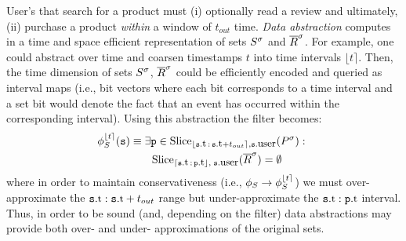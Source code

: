 \newcommand{\NotExistsP}{\ident{NotExistsP}}
\newcommand{\PrecedesP}{\precs{S}}
\newcommand{\PrecedesPP}{\omega_S}
\newcommand{\PrecedesPPP}{\psi_S}
\newcommand{\PrecedesPPPP}{\upsilon_S}


\newcommand{\interval}[1]{\lfloor #1 \rceil}
\newcommand{\uinterval}[1]{\lceil #1 \rfloor}
\newcommand{\hashid}[1]{\# #1}

User's that search for a product must (i) optionally read a review and
ultimately, (ii) purchase a product \emph{within} a window of $t_{out}$
time. \emph{Data abstraction} computes in a time and space efficient
representation of sets ${S}^{\sigma}$ and ${\overline{R}}^{\sigma}$.  For example, one could
abstract over time and coarsen timestamps $t$ into time intervals
$\interval{t}$.  Then, the time dimension of sets ${S}^{\sigma}$, ${\overline{R}}^{\sigma}$ could
be efficiently encoded and queried as interval maps (i.e., bit vectors where
each bit corresponds to a time interval and a set bit would denote the fact that
an event has occurred within the corresponding interval).  Using this
abstraction the filter becomes:
\begin{align*}
\PrecedesP^{\interval{t}}(\symv{s}) 
&\equiv  
\exists \symv{p} \in 
\slice{\syms{P}}
{\interval{\facc{\symv{s}}{t}\,:\,\facc{\symv{s}}{t} + t_{out}},
	\facc{\symv{s}}{user}} :\ 
\\
&\qquad
\slice{\syms{\oR}}
{\uinterval{\facc{\symv{s}}{t}\,:\,\facc{\symv{p}}{t}},\; 
 \facc{\symv{s}}{user}}
= \emptyset 
\end{align*}
where in order to maintain conservativeness (i.e.,
$\PrecedesP \rightarrow \PrecedesP^{\interval{t}} $) we must over-approximate
the $\facc{\symv{s}}{t}:\facc{\symv{s}}{t} + t_{out}$ range but
under-approximate the $\facc{\symv{s}}{t}:\facc{\symv{p}}{t}$ interval.  Thus,
in order to be sound (and, depending on the filter) data abstractions may
provide both over- and under- approximations of the original sets.
  

